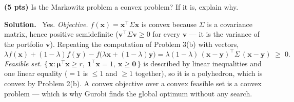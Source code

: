 \documentclass[10pt]{article}
\newenvironment{solution}
  {\par\smallskip\begingroup\color{solink}\textbf{Solution.}\ }
  {\endgroup\par}
\begin{document}
\begin{parts}
\item \textbf{(5 pts)} Is the Markowitz problem a convex problem? If it is, explain why.

\begin{solution}
Yes. \emph{Objective.} $f(\bm{x}) = \bm{x}^{\top}\Sigma \bm{x}$ is convex because $\Sigma$ is a
covariance matrix, hence positive semidefinite ($\bm{v}^{\top}\Sigma \bm{v} \ge 0$ for every $\bm{v}$
--- it is the variance of the portfolio $\bm{v}$). Repeating the computation of Problem 3(b)
with vectors,
\[
  \lambda f(\bm{x}) + (1-\lambda) f(\bm{y}) - f\big(\lambda \bm{x} + (1-\lambda) \bm{y}\big)
  = \lambda(1-\lambda)\,(\bm{x}-\bm{y})^{\top}\Sigma\,(\bm{x}-\bm{y}) \;\ge\; 0 .
\]
\emph{Feasible set.} $\{\, \bm{x} : \bm{\mu}^{\top}\bm{x} \ge r,\ \mathbf{1}^{\top}\bm{x} = 1,\ \bm{x} \ge \bm{0} \,\}$ is
described by linear inequalities and one linear equality ($= 1$ is $\le 1$ and $\ge 1$
together), so it is a polyhedron, which is convex by Problem 2(b). A convex objective over
a convex feasible set is a convex problem --- which is why Gurobi finds the global optimum
without any search.
\end{solution}
\end{parts}
\end{document}
